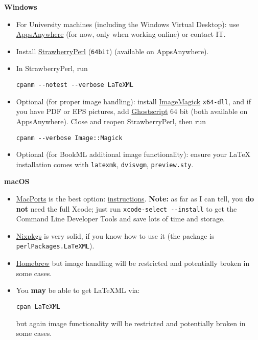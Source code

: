\documentclass[a4paper]{article}
\theoremstyle{definition}
\begin{document}
\begin{h:details}
  \begin{h:summary}\textbf{Windows}\end{h:summary}
  \begin{itemize}
    \item For University machines (including the Windows Virtual Desktop): use \href{https://it.leeds.ac.uk/it?id=kb_article&sysparm_article=KB0014827}{AppsAnywhere} (for now, only when working online) or contact IT.
    \item Install \href{https://strawberryperl.com/}{StrawberryPerl} (\texttt{64bit}) (available on AppsAnywhere).
    \item In StrawberryPerl, run
      \begin{lstlisting}
cpanm --notest --verbose LaTeXML
      \end{lstlisting}
    \item Optional (for proper image handling): install \href{https://imagemagick.org/script/download.php}{ImageMagick} \texttt{x64-dll}, and if you have PDF or EPS pictures, add \href{https://www.ghostscript.com/download/gsdnld.html}{Ghostscript} 64 bit (both available on AppsAnywhere). Close and reopen StrawberryPerl, then run
      \begin{lstlisting}
cpanm --verbose Image::Magick
      \end{lstlisting}
    \item Optional (for BookML additional image functionality): ensure your \LaTeX{} installation comes with \texttt{latexmk}, \texttt{dvisvgm}, \texttt{preview.sty}.
  \end{itemize}
\end{h:details}

\begin{h:details}
  \begin{h:summary}\textbf{macOS}\end{h:summary}
  \begin{itemize}
    \item \href{https://www.macports.org/}{MacPorts} is the best option: \href{https://dlmf.nist.gov/LaTeXML/get.html}{instructions}. \textbf{Note:} as far as I can tell, you \textbf{do not} need the full Xcode; just run \lstinline|xcode-select --install| to get the Command Line Developer Tools and save lots of time and storage.
    \item \href{https://nixos.wiki/wiki/Nixpkgs}{Nixpkgs} is very solid, if you know how to use it (the package is \texttt{perlPackages.LaTeXML}).
    \item \href{https://brew.sh/}{Homebrew} but image handling will be restricted and potentially broken in some cases.
    \item You \textbf{may} be able to get LaTeXML via:
      \begin{lstlisting}
cpan LaTeXML
      \end{lstlisting}
      but again image functionality will be restricted and potentially broken in some cases.
  \end{itemize}
\end{h:details}
\end{document}

